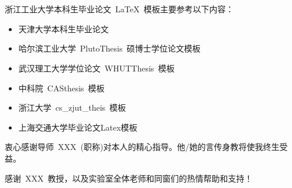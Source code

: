 
\chapter{\acknowledgementtitle}

浙江工业大学本科生毕业论文~\LaTeX~模板主要参考以下内容：
\begin{itemize}
  \item 天津大学本科生毕业论文
  \item 哈尔滨工业大学~PlutoThesis~硕博士学位论文模板
  \item 武汉理工大学学位论文~WHUTThesis~模板
  \item 中科院~CASthesis~模板
  \item 浙江大学~cs\_zjut\_theis~模板
  \item 上海交通大学毕业论文Latex模板
\end{itemize}

\vspace*{1em}

衷心感谢导师~XXX~(职称)对本人的精心指导。他/她的言传身教将使我终生受益。

感谢~XXX~教授，以及实验室全体老师和同窗们的热情帮助和支持！




